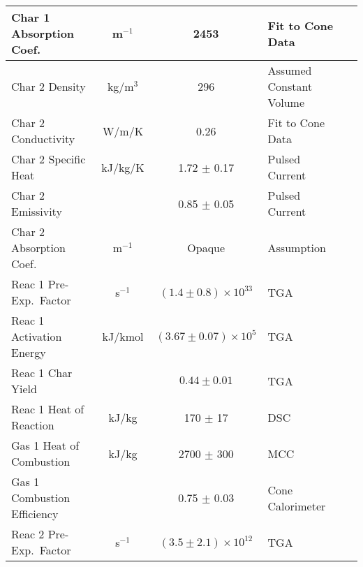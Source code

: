 \begin{table}[h!]
\begin{center}
\begin{tabular}{|l|c|c|l|l|}
Char 1 Absorption Coef.     & m$^{-1}$      & 2453                              & Fit to Cone Data          &  \cite{Stoliarov:CF2010}                  \\ \hline
Char 2 Density              & kg/m$^3$      & 296                               & Assumed Constant Volume   &  \cite{Stoliarov:CF2010}                  \\ \hline
Char 2 Conductivity         & W/m/K         & 0.26                              & Fit to Cone Data          &  \cite{Stoliarov:CF2010}                  \\ \hline
Char 2 Specific Heat        & kJ/kg/K       & 1.72 $\pm$ 0.17                   & Pulsed Current            &  \cite{Stoliarov:CF2010,Matsumoto:1996}   \\ \hline
Char 2 Emissivity           &               & 0.85 $\pm$ 0.05                   & Pulsed Current            &  \cite{Stoliarov:CF2010,Matsumoto:1996}   \\ \hline
Char 2 Absorption Coef.     & m$^{-1}$      & Opaque                            & Assumption                &  \cite{Stoliarov:CF2010}                  \\ \hline
Reac 1 Pre-Exp.~Factor      & s$^{-1}$      & $(1.4 \pm 0.8) \times 10^{33}$    & TGA                       &  \cite{Stoliarov:CF2010}                  \\ \hline
Reac 1 Activation Energy    & kJ/kmol       & $(3.67 \pm 0.07) \times 10^{5}$   & TGA                       &  \cite{Stoliarov:CF2010}                  \\ \hline
Reac 1 Char Yield           &               & $0.44 \pm 0.01$                   & TGA                       &  \cite{Stoliarov:CF2010}                  \\ \hline
Reac 1 Heat of Reaction     & kJ/kg         & 170 $\pm$ 17                      & DSC                       &  \cite{Stoliarov:PDS2008}                 \\ \hline
Gas 1 Heat of Combustion    & kJ/kg         & 2700 $\pm$ 300                    & MCC                       &  \cite{Stoliarov:CF2010}                  \\ \hline
Gas 1 Combustion Efficiency &               & 0.75 $\pm$ 0.03                   & Cone Calorimeter          &  \cite{Stoliarov:CF2010}                  \\ \hline
Reac 2 Pre-Exp.~Factor      & s$^{-1}$      & $(3.5 \pm 2.1) \times 10^{12}$    & TGA                       &  \cite{Stoliarov:CF2010}                  \\ \hline

\end{tabular}
\end{center}
\end{table}

